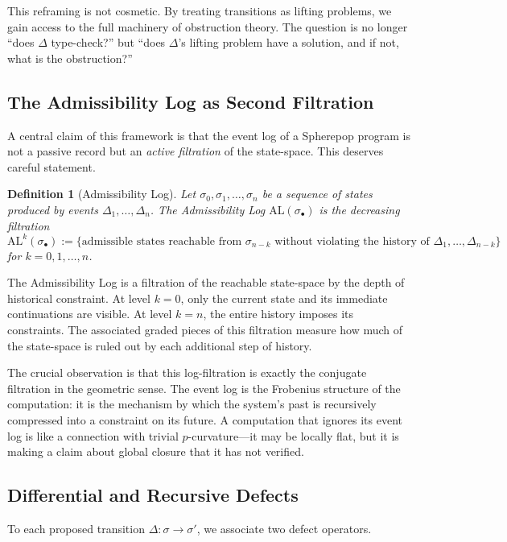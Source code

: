 \documentclass[12pt]{article}
\newtheorem{definition}{Definition}
\begin{document}
This reframing is not cosmetic. By treating transitions as lifting problems, we gain
access to the full machinery of obstruction theory. The question is no longer
``does $\Delta$ type-check?'' but ``does $\Delta$'s lifting problem have a solution,
and if not, what is the obstruction?''

\subsection{The Admissibility Log as Second Filtration}

A central claim of this framework is that the event log of a Spherepop program is not
a passive record but an \emph{active filtration} of the state-space. This deserves
careful statement.

\begin{definition}[Admissibility Log]
Let $\sigma_0, \sigma_1, \ldots, \sigma_n$ be a sequence of states produced by events
$\Delta_1, \ldots, \Delta_n$. The \emph{Admissibility Log} $\mathrm{AL}(\sigma_\bullet)$
is the decreasing filtration
\[
\mathrm{AL}^k(\sigma_\bullet) := \{ \text{admissible states reachable from } \sigma_{n-k}
\text{ without violating the history of } \Delta_1, \ldots, \Delta_{n-k} \}
\]
for $k = 0, 1, \ldots, n$.
\end{definition}

The Admissibility Log is a filtration of the reachable state-space by the depth of
historical constraint. At level $k = 0$, only the current state and its immediate
continuations are visible. At level $k = n$, the entire history imposes its
constraints. The associated graded pieces of this filtration measure how much of the
state-space is ruled out by each additional step of history.

The crucial observation is that this log-filtration is exactly the conjugate filtration
in the geometric sense. The event log is the Frobenius structure of the computation:
it is the mechanism by which the system's past is recursively compressed into a
constraint on its future. A computation that ignores its event log is like a connection
with trivial $p$-curvature---it may be locally flat, but it is making a claim about
global closure that it has not verified.

\subsection{Differential and Recursive Defects}

To each proposed transition $\Delta : \sigma \to \sigma'$, we associate two defect
operators.
\end{document}
